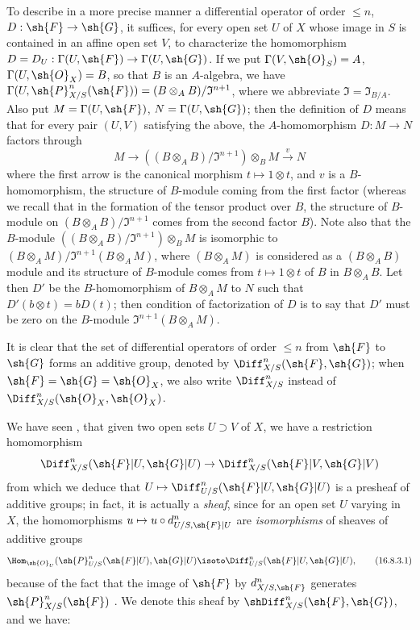 \begin{env}[16.8.2]
\label{IV.16.8.2}
To describe in a more precise manner a differential operator of order $\leq n$, $D: \sh{F} \to \sh{G}$, it suffices, for every open set $U$ of $X$ whose image in $S$ is contained in an affine open set $V$, to characterize the homomorphism $D = D_U: \Gamma(U, \sh{F}) \to \Gamma(U, \sh{G})$.
If we put $\Gamma(V, \sh{O}_S) = A$, $\Gamma(U, \sh{O}_X) = B$, so that $B$ is an $A$-algebra, we have $\Gamma(U, \sh{P}_{X/S}^n(\sh{F}) ) = (B \otimes_A B)/\mathfrak{I}^{n+1}$, where we abbreviate $\mathfrak{I} = \mathfrak{I}_{B/A}$. 
Also put $M = \Gamma(U, \sh{F})$, $N = \Gamma(U, \sh{G})$;
then the definition of $D$ means that for every pair $(U,V)$ satisfying the above, the $A$-homomorphism $D:M \to N$ factors through
\[
  M \to ((B \otimes_A B)/\mathfrak{I}^{n+1}) \otimes_B M \xrightarrow{v} N
\]
where the first arrow is the canonical morphism $t \mapsto 1 \otimes t$, and $v$ is a $B$-homomorphism, the structure of $B$-module coming from the first factor (whereas we recall that in the formation of the tensor product over $B$, the structure of $B$-module on $(B \otimes_A B)/\mathfrak{I}^{n+1}$ comes from the second factor $B$).
Note also that the $B$-module $((B \otimes_A B)/\mathfrak{I}^{n+1}) \otimes_B M$ is isomorphic to $(B \otimes_A M)/\mathfrak{I}^{n+1}(B \otimes_A M)$, where $(B \otimes_A M)$ is considered as a $(B \otimes_A B)$ module and its structure of $B$-module comes from $t \mapsto 1 \otimes t$ of $B$ in $B \otimes_A B$.  
Let then $D'$ be the $B$-homomorphism of $B \otimes_A M$ to $N$ such that $D'(b \otimes t) = b D(t)$; then condition of factorization of $D$ is to say that $D'$ must be zero on the $B$-module $\mathfrak{I}^{n+1}(B \otimes_A M)$.
\end{env}

\begin{env}[16.8.3]
\label{IV.16.8.3}
It is clear that the set of differential operators of order $\leq n$ from $\sh{F}$ to $\sh{G}$ forms an additive group, denoted by $\Diff_{X/S}^n(\sh{F}, \sh{G})$;
when $\sh{F} = \sh{G} = \sh{O}_X$, we also write $\Diff_{X/S}^n$ instead of $\Diff_{X/S}^n(\sh{O}_X, \sh{O}_X)$.

We have seen , that given two open sets $U \supset V$ of $X$, we have a restriction homomorphism
\[
  \Diff_{X/S}^n(\sh{F}|U, \sh{G}|U) \to \Diff_{X/S}^n(\sh{F}|V, \sh{G}|V)
\]
from which we deduce that $U \mapsto \Diff_{U/S}^n(\sh{F}|U, \sh{G}|U)$ is a presheaf of additive groups;
in fact, it is actually a \emph{sheaf}, since for an open set $U$ varying in $X$, the homomorphisms $u \mapsto u \circ d_{U/S, \sh{F}|U}^n$ are \emph{isomorphisms} of sheaves of additive groups
\[
  \label{IV.16.8.3.1}
  \Hom_{\sh{O}_U}(\sh{P}_{U/S}^n(\sh{F}|U), \sh{G}|U) \isoto \Diff_{U/S}^n(\sh{F}|U, \sh{G}|U),
  \tag{16.8.3.1}
\]
because of the fact that the image of $\sh{F}$ by $d_{X/S, \sh{F}}^n$ generates $\sh{P}_{X/S}^n(\sh{F})$ .
We denote this sheaf by $\shDiff_{X/S}^n(\sh{F}, \sh{G})$, and we have:
\end{env}

